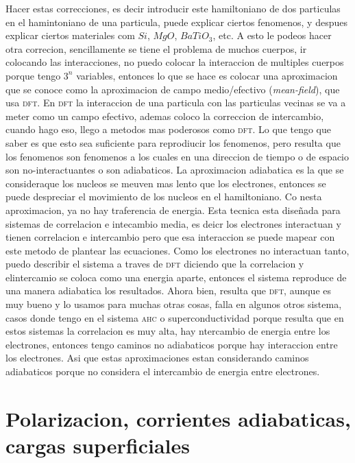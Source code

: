 \documentclass[11pt,fleqn]{book}
\begin{document}
Hacer estas correcciones, es decir introducir este hamiltoniano de dos particulas en el hamintoniano de una particula, puede explicar ciertos fenomenos, y despues explicar ciertos materiales com $Si$, $MgO$, $BaTiO_{3}$, etc. A esto le podeos hacer otra correcion, sencillamente se tiene el problema de muchos cuerpos, ir colocando las interacciones, no puedo colocar la interaccion de multiples cuerpos porque tengo $3^{n}$ variables, entonces lo que se hace es colocar una aproximacion que se conoce como la aproximacion de campo medio/efectivo (\textit{mean-field}), que usa \textsc{dft}. En \textsc{dft} la interaccion de una particula con las particulas vecinas se va a meter como un campo efectivo, ademas coloco la correccion de intercambio, cuando hago eso, llego a metodos mas poderosos como \textsc{dft}. Lo que tengo que saber es que esto sea suficiente para reprodiucir los fenomenos, pero resulta que los fenomenos son fenomenos a los cuales en una direccion de tiempo o de espacio son no-interactuantes o son adiabaticos. La aproximacion adiabatica es la que se consideraque los nucleos se meuven mas lento que los electrones, entonces se puede despreciar el movimiento de los nucleos en el hamiltoniano. Co nesta aproximacion, ya no hay traferencia de energia. Esta tecnica esta diseñada para sistemas  de correlacion e intecambio media, es deicr los electrones interactuan y tienen correlacion e intercambio pero que esa interaccion se puede mapear con este metodo de plantear las ecuaciones. Como los electrones no interactuan tanto, puedo describir el sistema a traves de \textsc{dft} diciendo que la correlacion y elintercamio se coloca como una energia aparte, entonces el sistema reproduce de una manera  adiabatica los resultados. Ahora bien, resulta que \textsc{dft}, aunque es muy bueno y lo usamos para muchas otras cosas, falla en algunos otros sistema, casos donde tengo en el sistema \textsc{ahc} o superconductividad porque resulta que en estos sistemas la correlacion es muy alta, hay ntercambio de energia entre los electrones, entonces tengo caminos no adiabaticos porque hay interaccion entre los electrones. Asi que estas aproximaciones estan considerando caminos adiabaticos porque no considera el intercambio de energia entre electrones.


\section{Polarizacion, corrientes adiabaticas, cargas superficiales}
\end{document}
